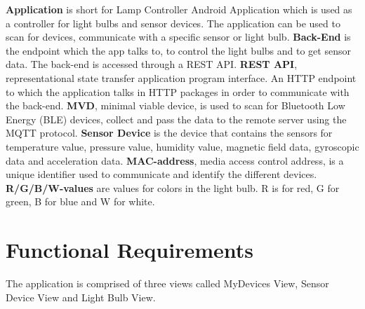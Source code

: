 \documentclass[a4paper]{article}
\begin{document}
\textbf{Application} is short for Lamp Controller Android Application which is used as a controller for light bulbs and sensor devices. The application can be used to scan for devices, communicate with a specific sensor or light bulb. 
\newline \newline
\textbf{Back-End} is the endpoint which the app talks to, to control the light bulbs and to get sensor data. The back-end is accessed through a REST API. 
\newline \newline
\textbf{REST API}, representational state transfer application program interface. An HTTP endpoint to which the application talks in HTTP packages in order to communicate with the back-end. 
\newline \newline
\textbf{MVD}, minimal viable device, is used to scan for Bluetooth Low Energy (BLE) devices, collect and pass the data to the remote server using the MQTT protocol.
\newline \newline
\textbf{Sensor Device} is the device that contains the sensors for temperature value, pressure value, humidity value, magnetic field data, gyroscopic data and acceleration data.
\newline \newline
\textbf{MAC-address}, media access control address, is a unique identifier used to communicate and identify the different devices.
\newline \newline
\textbf{R/G/B/W-values} are values for colors in the light bulb. R is for red, G for green, B for blue and W for white.
\section{Functional Requirements}

The application is comprised of three views called MyDevices View, Sensor Device View and Light Bulb View. 
\end{document}
